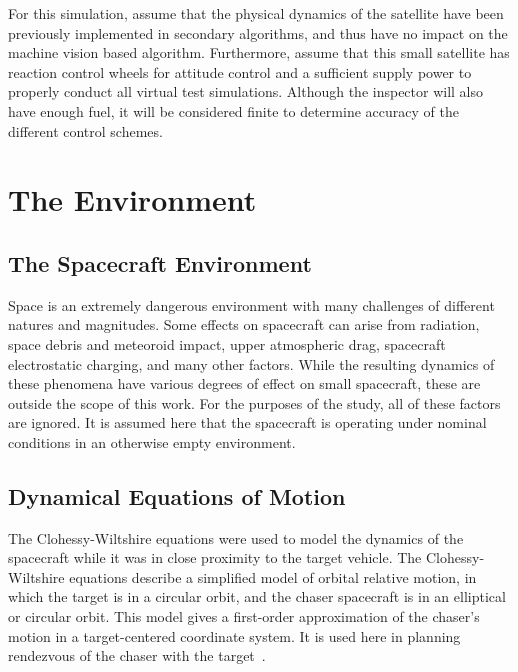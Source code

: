 \documentclass[journal, 10pt]{IEEEtran}
\begin{document}
For this simulation, assume that the physical dynamics of the satellite have been previously implemented in secondary algorithms, and thus have no impact on the machine vision based algorithm. Furthermore, assume that this small satellite has reaction control wheels for attitude control and a sufficient supply power to properly conduct all virtual test simulations.  Although the inspector will also have enough fuel, it will be considered finite to determine accuracy of the different control schemes.

\section{The Environment}
\subsection{The Spacecraft Environment}
Space is an extremely dangerous environment with many challenges of different natures and magnitudes. Some effects on spacecraft can arise from radiation, space debris and meteoroid impact, upper atmospheric drag, spacecraft electrostatic charging, and many other factors. While the resulting dynamics of these phenomena have various degrees of effect on small spacecraft, these are outside the scope of this work. For the purposes of the study, all of these factors are ignored. It is assumed here that the spacecraft is operating under nominal conditions in an otherwise empty environment.

\subsection{Dynamical Equations of Motion} \label{cweqs}
The Clohessy-Wiltshire equations were used to model the dynamics of the spacecraft while it was in close proximity to the target vehicle. The Clohessy-Wiltshire equations describe a simplified model of orbital relative motion, in which the target is in a circular orbit, and the chaser spacecraft is in an elliptical or circular orbit. This model gives a first-order approximation of the chaser's motion in a target-centered coordinate system. It is used here in planning rendezvous of the chaser with the target~\cite{cw_eqs}.
\end{document}
